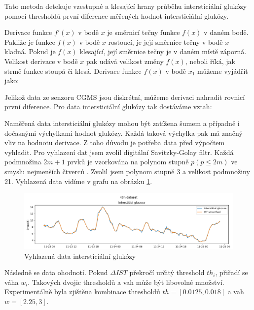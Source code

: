 Tato metoda detekuje vzestupné a klesající hrany průběhu intersticiální glukózy pomocí thresholdů první diference měřených hodnot intersticiální glukózy.

Derivace funkce $f'(x)$ v bodě $x$ je směrnicí tečny funkce $f(x)$ v daném bodě. Pakliže je funkce $f(x)$ v bodě $x$ rostoucí, je její směrnice tečny v bodě $x$ kladná. Pokud je $f(x)$ klesající, její směrnice tečny je v daném místě záporná. Velikost derivace v bodě $x$ pak udává velikost změny $f(x)$, neboli říká, jak strmě funkce stoupá či klesá. Derivace funkce $f(x)$ v bodě $x_{1}$ můžeme vyjádřit jako:


Jelikož data ze senzoru CGMS jsou diskrétní, můžeme derivaci nahradit rovnicí první diference. Pro data intersticiální glukózy tak dostáváme vztah:


Naměřená data intersticiální glukózy mohou být zatížena šumem a případně i dočasnými výchylkami hodnot glukózy. Každá taková výchylka pak má značný vliv na hodnotu derivace. Z toho důvodu je potřeba data před výpočtem vyhladit. Pro vyhlazení dat jsem zvolil digitální Savitzky-Golay filtr. Každá podmnožina $2m+1$ prvků je vzorkována na polynom stupně $p (p\leq 2m)$ ve smyslu nejmenších čtverců \citep{cho.savgol}. Zvolil jsem polynom stupně 3 a velikost podmnožiny 21. Vyhlazená data vidíme v grafu na obrázku \ref{fig:savgol}.

\begin{figure}[H]
\caption{Vyhlazená data intersticiální glukózy}
\label{fig:savgol}
\centering
\includegraphics[width=1\textwidth]{img/cho/savgol.png}
\end{figure}

Následně se data ohodnotí. Pokud $\Delta IST$ překročí určitý threshold $th_{i}$, přiřadí se váha $w_{i}$. Takových dvojic thresholdů a vah může být libovolné množství. Experimentálně byla zjištěna kombinace thresholdů $th=[0.0125, 0.018]$ a vah $w=[2.25, 3]$.

